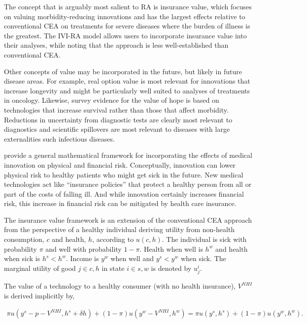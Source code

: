\documentclass[11pt,final,fleqn]{article}\usepackage[]{graphicx}\usepackage[]{color}
\theoremstyle{plain}
\begin{document}
The concept that is arguably most salient to RA is insurance value, which focuses on valuing morbidity-reducing innovations and has the largest effects relative to conventional CEA on treatments for severe diseases where the burden of illness is the greatest. The IVI-RA model allows users to incorporate insurance value into their analyses, while noting that the approach is less well-established than conventional CEA. 

Other concepts of value may be incorporated in the future, but likely in future disease areas. For example, real option value is most relevant for innovations that increase longevity and might be particularly well suited to analyses of treatments in oncology. Likewise, survey evidence for the value of hope is based on technologies that increase survival \citet{lakdawalla2012cancer} rather than those that affect morbidity. Reductions in uncertainty from diagnostic tests are clearly most relevant to diagnostics and scientific spillovers are most relevant to diseases with large externalities such infectious diseases. 

\citet{lakdawalla2017insurance} provide a general mathematical framework for incorporating the effects of medical innovation on physical and financial risk. Conceptually, innovation can lower physical risk to healthy patients who might get sick in the future. New medical technologies act like ``insurance policies'' that protect a healthy person from all or part of the costs of falling ill. And while innovation certainly increases financial risk, this increase in financial risk can be mitigated by health care insurance.  

The insurance value framework is an extension of the conventional CEA approach from the perspective of a healthy individual deriving utility from non-health consumption, $c$ and health, $h$, according to $u(c,h)$. The individual is sick with probability $\pi$ and well with probability $1-\pi$.  Health when well is $h^w$ and health when sick is $h^s < h^w$. Income is $y^w$ when well and $y^s <y^w$ when sick. The marginal utility of good $j \in {c,h}$ in state $i \in {s,w}$ is denoted by $u_j^i$. 

The value of a technology to a healthy consumer (with no health insurance), $V^{NHI}$ is derived implicitly by,

\begin{align}
\pi u(y^s - p - V^{NHI}, h^s + \delta h) + (1 - \pi)u\left(y^w - V^{NHI}, h^w \right) = 
\pi u(y^s, h^s) + (1-\pi) u(y^w, h^w).
\end{align}
\end{document}
